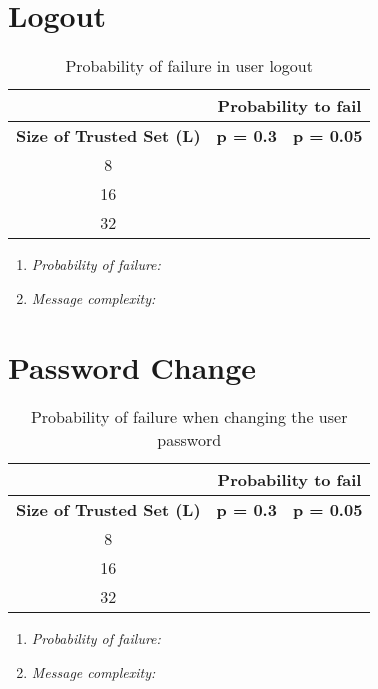 \section{Logout}
  \label{sec:eval_logout}
  \begin{table}
    \centering
    \footnotesize
    \begin{tabular}{|c|c|c|}
      \cline{2-3}
      \multicolumn{1}{c|}{}&  \multicolumn{2}{c|}{\textbf{Probability to fail}} \\ \cline{2-3}
      \hline
      \textbf{Size of Trusted Set (L)} & \textbf{p = 0.3} & \textbf{p = 0.05} \\
      \hline \hline
      8 &  &  \\
      \hline
      16 &  &  \\
      \hline
      32 &  &  \\
      \hline
    \end{tabular}
    \caption{Probability of failure in user logout}
    \label{tab:p_logout}
  \end{table}
  
  \begin{enumerate}
    \item{\textit{Probability of failure:}}
    \item{\textit{Message complexity:}}
  \end{enumerate}

\section{Password Change}
  \label{sec:eval_password_change}
  \begin{table}
    \centering
    \footnotesize
    \begin{tabular}{|c|c|c|}
      \cline{2-3}
      \multicolumn{1}{c|}{}&  \multicolumn{2}{c|}{\textbf{Probability to fail}} \\ \cline{2-3}
      \hline
      \textbf{Size of Trusted Set (L)} & \textbf{p = 0.3} & \textbf{p = 0.05} \\
      \hline \hline
      8 &  &  \\
      \hline
      16 &  &  \\
      \hline
      32 &  &  \\
      \hline
    \end{tabular}
    \caption{Probability of failure when changing the user password}
    \label{tab:p_password_change}
  \end{table}
  
  \begin{enumerate}
    \item{\textit{Probability of failure:}}
    \item{\textit{Message complexity:}}
  \end{enumerate}

